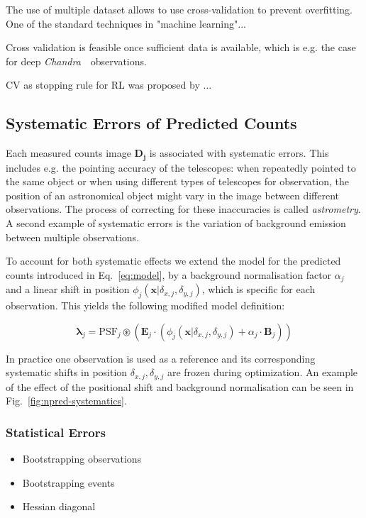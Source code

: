 \documentclass[twocolumn]{aastex631}
\newcommand{\chandra}{\textit{Chandra}~}
\begin{document}
    The use of multiple dataset allows to use cross-validation to prevent overfitting.
    One of the standard techniques in "machine learning"...

    Cross validation is feasible once sufficient data is available, which is e.g. the 
    case for deep \chandra~observations.

    CV as stopping rule for RL was proposed by \cite{Reeves1995}...

    \subsection{Systematic Errors of Predicted Counts}
    Each measured counts image $\mathbf{D_j}$ is associated with systematic errors.
    This includes e.g. the pointing accuracy of the telescopes: when repeatedly pointed
    to the same object or when using different types of telescopes for observation, the
    position of an astronomical object might vary in the image between different
    observations. The process of correcting for these inaccuracies is called \textit{astrometry}.
    A second example of systematic errors is the variation of background emission
    between multiple observations.
    
    To account for both systematic effects we extend the model for the predicted
    counts introduced in Eq.~\ref{eq:model}, by a background normalisation factor
    $\alpha_j$ and a linear shift in position $\phi_j(\mathbf{x}| \delta_{x,j}, \delta_{y,j})$,
    which is specific for each observation. This yields the following modified model definition:
    
    \begin{equation}
        \label{eq:model-npred-calibration}
        \mathbf{\lambda}_j = \mathrm{PSF}_j \circledast \left(\mathbf{E}_j \cdot (\phi_j(\mathbf{x}| \delta_{x,j}, \delta_{y,j}) + \alpha_j \cdot \mathbf{B}_j) \right)
    \end{equation}
    
    In practice one observation is used as a reference and its corresponding
    systematic shifts in position $\delta_{x,j}, \delta_{y,j}$ are frozen during
    optimization. An example of the effect of the positional shift and background
    normalisation can be seen in Fig.~\ref{fig:npred-systematics}.

    \subsubsection{Statistical Errors}
    \begin{itemize}
        \item Bootstrapping observations
        \item Bootstrapping events
        \item Hessian diagonal
    \end{itemize}
    
\end{document}
